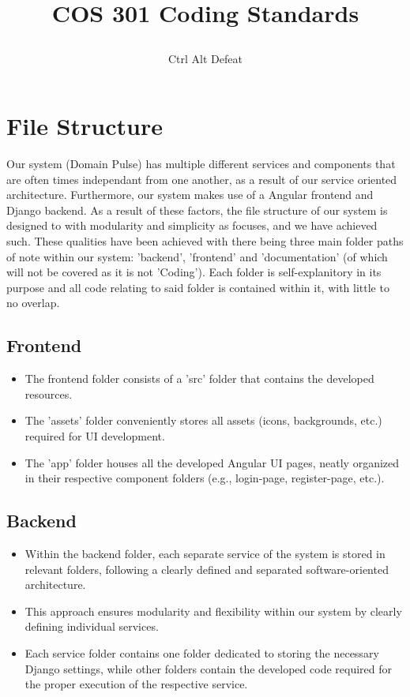 \documentclass[12pt]{article}
\title{

\\
{COS 301 Coding Standards}
}
\author{Ctrl Alt Defeat}
\begin{document}


\tableofcontents

\newpage


\section{File Structure}
Our system (Domain Pulse) has multiple different services and components that are often times independant from one another, as a result of our service oriented architecture. Furthermore, our system makes use of a Angular frontend and Django backend. As a result of these factors, the file structure of our system is designed to with modularity and simplicity as focuses, and we have achieved such. These qualities have been achieved with there being three main folder paths of note within our system: 'backend', 'frontend' and 'documentation' (of which will not be covered as it is not 'Coding'). Each folder is self-explanitory in its purpose and all code relating to said folder is contained within it, with little to no overlap.

\subsection{Frontend}
\begin{itemize}
    \item The frontend folder consists of a 'src' folder that contains the developed resources.
    \item The 'assets' folder conveniently stores all assets (icons, backgrounds, etc.) required for UI development.
    \item The 'app' folder houses all the developed Angular UI pages, neatly organized in their respective component folders (e.g., login-page, register-page, etc.).
    \end{itemize}
\subsection{Backend}
\begin{itemize}
    \item Within the backend folder, each separate service of the system is stored in relevant folders, following a clearly defined and separated software-oriented architecture.
    \item This approach ensures modularity and flexibility within our system by clearly defining individual services.
    \item Each service folder contains one folder dedicated to storing the necessary Django settings, while other folders contain the developed code required for the proper execution of the respective service.
    \end{itemize}
\end{document}
